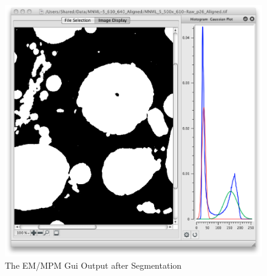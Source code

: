 \documentclass[12pt,oneside]{book}
\begin{document}
 
\begin{figure}[htbp]
\begin{center}
\includegraphics[width=6.0in]{images/Untitled6.png}
\caption{The EM/MPM Gui Output after Segmentation}
\label{image6}
\end{center}
\end{figure}
\end{document}
